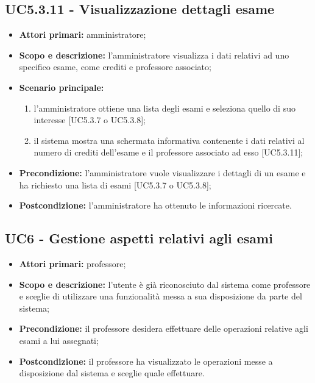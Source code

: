 \documentclass[AnalisiDeiRequisiti.tex]{subfiles}
\begin{document}
\subsection{UC5.3.11 - Visualizzazione dettagli esame}
\begin{itemize}
	\item \textbf{Attori primari:} amministratore;
	\item \textbf{Scopo e descrizione:} l'amministratore visualizza i dati relativi ad uno specifico esame, come crediti e professore associato;
	\item \textbf{Scenario principale:}
		\begin{enumerate}
			\item l'amministratore ottiene una lista degli esami e seleziona quello di suo interesse [UC5.3.7 o UC5.3.8];
			\item il sistema mostra una schermata informativa contenente i dati relativi al numero di crediti dell'esame e il professore associato ad esso [UC5.3.11];
		\end{enumerate}
	\item \textbf{Precondizione:} l'amministratore vuole visualizzare i dettagli di un esame e ha richiesto una lista di esami [UC5.3.7 o UC5.3.8]; 
	\item \textbf{Postcondizione:} l'amministratore ha ottenuto le informazioni ricercate.
\end{itemize}

\subsection{UC6 - Gestione aspetti relativi agli esami}
\begin{itemize}
	\item \textbf{Attori primari:} professore;\\
	\item \textbf{Scopo e descrizione:} l'utente è già riconosciuto dal sistema come professore e sceglie di utilizzare una funzionalità messa a sua disposizione da parte del sistema;\\
	\item \textbf{Precondizione:} il professore desidera effettuare delle operazioni relative agli esami a lui assegnati;\\
	\item \textbf{Postcondizione:} il professore ha visualizzato le operazioni messe a disposizione dal sistema e sceglie quale effettuare.\\
\end{itemize}
\end{document}
